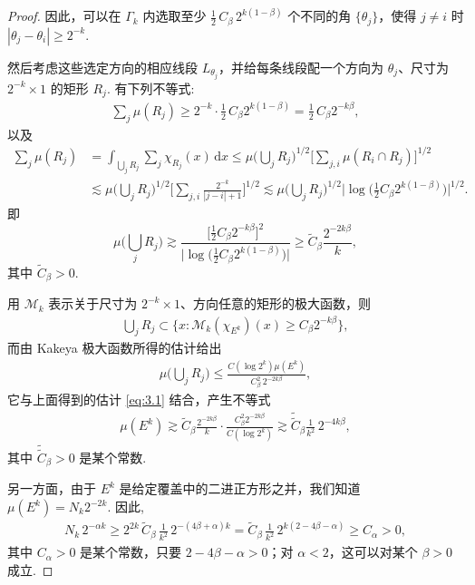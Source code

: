 \begin{proof}
因此，可以在 $\Gamma_k$ 内选取至少 $\frac{1}{2}\,C_\beta\,2^{k(1-\beta)}$ 个不同的角 $\{\theta_j\}$，使得 $j \neq i$ 时 $|\theta_j - \theta_i| \geq 2^{-k}$.

然后考虑这些选定方向的相应线段 $L_{\theta_j}$，并给每条线段配一个方向为 $\theta_j$、尺寸为 $2^{-k} \times 1$ 的矩形 $R_j$. 有下列不等式:
\begin{align*}
  \sum_{j}\mu(R_{j})\geq 2^{-k}\cdot\frac{1}{2}\,C_{\beta}2^{k(1-\beta)}=\frac{1}{2}\,C_{\beta}2^{-k\beta},
\end{align*}
以及
\begin{align*}
  \sum_{j}\mu(R_{j})
  &=\int_{\bigcup_{j}R_{j}}\sum_{j}\chi_{R_{j}}(x)\,\mathrm{d}x
  \leq\mu\Big(\bigcup_{j}R_{j}\Big)^{1/2}\Big[\sum_{j,i}\mu(R_{i}\cap R_{j})\Big]^{1/2}\\
  &\lesssim\mu\Big(\bigcup_{j}R_{j}\Big)^{1/2}
   \Big[\sum_{j,i}\frac{2^{-k}}{|j-i|+1}\Big]^{1/2}
  \lesssim\mu\Big(\bigcup_{j}R_{j}\Big)^{1/2}
   \Big|\log\Big(\tfrac{1}{2}C_\beta 2^{k(1-\beta)}\Big)\Big|^{1/2}.
\end{align*}
即
\begin{equation}\label{eq:3.1}
  \mu\Big(\bigcup_{j}R_{j}\Big)
  \gtrsim\frac{\bigl[\frac{1}{2}C_{\beta}2^{-k\beta}\bigr]^{2}}{\bigl|\log\bigl(\frac{1}{2}C_{\beta}2^{k(1-\beta)}\bigr)\bigr|}
  \geq\widetilde{C}_{\beta}\frac{2^{-2k\beta}}{k},
\end{equation}
其中 $\widetilde{C}_{\beta}>0$.

用 $\mathcal{M}_k$ 表示关于尺寸为 $2^{-k} \times 1$、方向任意的矩形的极大函数，则
\begin{align*}
  \bigcup_{j}R_{j}\subset\{x:\mathcal{M}_{k}(\chi_{E^{k}})(x)\geq C_{\beta}2^{-k\beta}\},
\end{align*}
而由 Kakeya 极大函数所得的估计给出
\begin{align*}
  \mu\Big(\bigcup_{j}R_{j}\Big)\leq\frac{C\left(\log 2^{k}\right)\mu(E^{k})}{C_{\beta}^{2}\,2^{-2k\beta}},
\end{align*}
它与上面得到的估计 \eqref{eq:3.1} 结合，产生不等式
\begin{align*}
  \mu(E^{k})\gtrsim\widetilde{C}_{\beta}\frac{2^{-2k\beta}}{k}\cdot\frac{C_{\beta}^{2}2^{-2k\beta}}{C\left(\log 2^{k}\right)}
  \gtrsim\widetilde{\widetilde{C}}_{\beta}\frac{1}{k^{2}}\,2^{-4k\beta},
\end{align*}
其中 $\widetilde{\widetilde{C}}_{\beta} > 0$ 是某个常数.

另一方面，由于 $E^k$ 是给定覆盖中的二进正方形之并，我们知道 $\mu(E^k) = N_k 2^{-2k}$. 因此,
\begin{align*}
  N_{k}\,2^{-\alpha k}
  \geq 2^{2k}\,\widetilde{C}_{\beta}\,\frac{1}{k^{2}}\,2^{-(4\beta+\alpha)k}
  =\widetilde{C}_{\beta}\,\frac{1}{k^{2}}\,2^{k(2-4\beta-\alpha)}
  \geq C_{\alpha}>0,
\end{align*}
其中 $C_\alpha > 0$ 是某个常数，只要 $2 - 4\beta - \alpha > 0$；对 $\alpha < 2$，这可以对某个 $\beta > 0$ 成立.
\end{proof}

